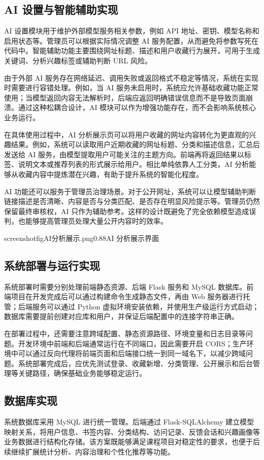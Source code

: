 \documentclass[12pt,a4paper]{ctexart}
\begin{document}
\subsection{AI 设置与智能辅助实现}
AI 设置模块用于维护外部模型服务相关参数，例如 API 地址、密钥、模型名称和启用状态等。管理员可以根据实际情况调整 AI 服务配置，从而避免将参数写死在代码中。智能辅助功能主要围绕网址标题、描述和用户收藏行为展开，可用于生成关键词、分析兴趣标签或辅助判断 URL 风险。

由于外部 AI 服务存在网络延迟、调用失败或返回格式不稳定等情况，系统在实现时需要进行容错处理。例如，当 AI 服务未启用时，系统应允许基础收藏功能正常使用；当模型返回内容无法解析时，后端应返回明确错误信息而不是导致页面崩溃。通过这种松耦合设计，AI 模块可以作为增强功能存在，而不会影响系统核心业务运行。

在具体使用过程中，AI 分析展示页可以将用户收藏的网址内容转化为更直观的兴趣结果。例如，系统可以读取用户近期收藏的网址标题、分类和描述信息，汇总后发送给 AI 服务，由模型提取用户可能关注的主题方向。前端再将返回结果以标签、说明文本或推荐列表的形式展示给用户。相比单纯依靠人工分类，AI 分析能够从收藏内容中提炼潜在兴趣，有助于提升系统的智能化程度。

AI 功能还可以服务于管理员治理场景。对于公开网址，系统可以让模型辅助判断链接描述是否清晰、内容是否与分类匹配、是否存在明显风险提示等。管理员仍然保留最终审核权，AI 只作为辅助参考。这样的设计既避免了完全依赖模型造成误判，也能够提高管理员处理大量公开内容时的效率。

screenshotfig{AI分析展示.png}{0.88}{AI 分析展示界面}

\subsection{系统部署与运行实现}
系统部署时需要分别处理前端静态资源、后端 Flask 服务和 MySQL 数据库。前端项目在开发完成后可以通过构建命令生成静态文件，再由 Web 服务器进行托管；后端服务可以通过 Python 虚拟环境安装依赖，并使用生产级运行方式启动；数据库需要提前创建对应库和用户，并保证后端配置中的连接字符串正确。

在部署过程中，还需要注意跨域配置、静态资源路径、环境变量和日志目录等问题。开发环境中前端和后端通常运行在不同端口，因此需要开启 CORS；生产环境中可以通过反向代理将前端页面和后端接口统一到同一域名下，以减少跨域问题。系统部署完成后，应优先测试登录、收藏新增、分类管理、公开展示和后台管理等关键路径，确保基础业务能够稳定运行。

\subsection{数据库实现}
系统数据库采用 MySQL 进行统一管理。后端通过 Flask-SQLAlchemy 建立模型映射关系，将用户信息、书签内容、分类结构、访问记录、反馈会话和兴趣画像等业务数据进行结构化存储。该方案既能够满足课程项目对稳定性的要求，也便于后续继续扩展统计分析、内容治理和个性化推荐等功能。
\end{document}

